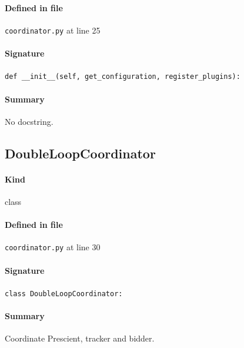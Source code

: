 \documentclass[11pt]{report}
\begin{document}
\paragraph{Defined in file} \texttt{coordinator.py} at line 25
\paragraph{Signature} \texttt{def \_\_init\_\_(self, get\_configuration, register\_plugins):}
\paragraph{Summary} No docstring.
\subsection{DoubleLoopCoordinator}
\label{def:coordinator.py:DoubleLoopCoordinator:L30}
\paragraph{Kind} class
\paragraph{Defined in file} \texttt{coordinator.py} at line 30
\paragraph{Signature} \texttt{class DoubleLoopCoordinator:}
\paragraph{Summary} Coordinate Prescient, tracker and bidder.
\end{document}
